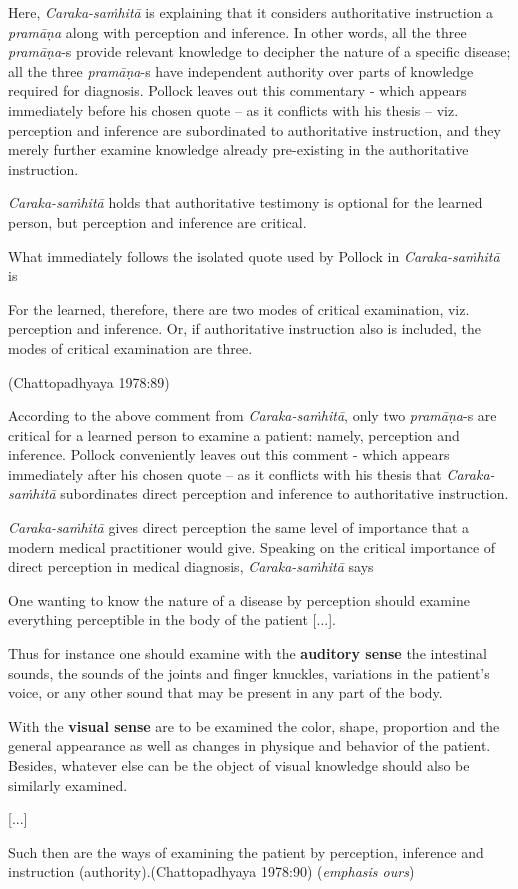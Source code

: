 Here, {\sl Caraka-saṁhitā} is explaining that it considers authoritative instruction a {\sl pramāṇa} along with perception and inference. In other words, all the three {\sl pramāṇa}-s provide relevant knowledge to decipher the nature of a specific disease; all the three {\sl pramāṇa}-s have independent authority over parts of knowledge required for diagnosis. Pollock leaves out this commentary - which appears immediately before his chosen quote -- as it conflicts with his thesis -- viz. perception and inference are subordinated to authoritative instruction, and they merely further examine knowledge already pre-existing in the authoritative instruction.

{\sl Caraka-saṁhitā} holds that authoritative testimony is optional for the learned person, but perception and inference are critical.

What immediately follows the isolated quote used by Pollock in {\sl Caraka-saṁhitā} is 
\begin{myquote}
For the learned, therefore, there are two modes of critical examination, viz. perception and inference. Or, if authoritative instruction also is included, the modes of critical examination are three.

\hfill (Chattopadhyaya 1978:89)
\end{myquote}

According to the above comment from {\sl Caraka-saṁhitā}, only two {\sl pramāṇa}-s are critical for a learned person to examine a patient: namely, perception and inference. Pollock conveniently leaves out this comment - which appears immediately after his chosen quote -- as it conflicts with his thesis that {\sl Caraka-saṁhitā} subordinates direct perception and inference to authoritative instruction.  

{{\sl Caraka-saṁhitā}\relax} gives direct perception the same level of importance that a modern medical practitioner would give. Speaking on the critical importance of direct perception in medical diagnosis, {\sl Caraka-saṁhitā} says
\begin{myquote}
One wanting to know the nature of a disease by perception should examine everything perceptible in the body of the patient [...].

Thus for instance one should examine with the {\bf auditory sense} the intestinal sounds, the sounds of the joints and finger knuckles, variations in the patient's voice, or any other sound that may be present in any part of the body.  

With the {\bf visual sense} are to be examined the color, shape, proportion and the general appearance as well as changes in physique and behavior of the patient.  Besides, whatever else can be the object of visual knowledge should also be similarly examined.

[...]

Such then are the ways of examining the patient by perception, inference and instruction (authority).\hfill (Chattopadhyaya 1978:90) ({\sl emphasis ours})
\end{myquote}


